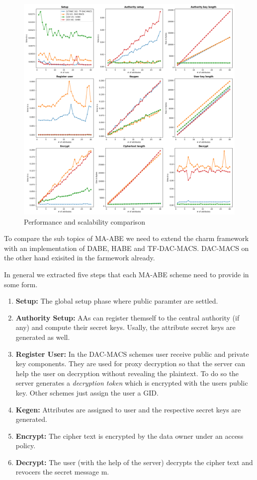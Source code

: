 \begin{figure}[!ht]
\centering
    \includegraphics[width=1\linewidth]{img/maabe_comparisons.png}
    \caption{Performance and scalability comparison}
    \label{fig:maabe_comparison}
\end{figure}

To compare the sub topics of \ac{MA-ABE} we need to extend the charm framework with an implementation of \ac{DABE}, \ac{HABE} and \ac{TF-DAC-MACS}. \ac{DAC-MACS} on the other hand exisited in the farmework already. 

In general we extracted five steps that each \ac{MA-ABE} scheme need to provide in some form. 
\begin{enumerate}
	\item \textbf{Setup:} The global setup phase where public paramter are settled.
	\item \textbf{Authority Setup:} \ac{AA}s can register themself to the central authority (if any) and compute their secret keys. Usally, the attribute secret keys are generated as well. 
	\item \textbf{Register User:} In the \ac{DAC-MACS} schemes user receive public and private key components. They are used for proxy decryption so that the server can help the user on decryption without revealing the plaintext. To do so the server generates a \textit{decryption token} which is encrypted with the users public key. Other schemes just assign the user a \ac{GID}. 
	\item \textbf{Kegen:} Attributes are assigned to user and the respective secret keys are generated.
	\item \textbf{Encrypt:} The cipher text is encrypted by the data owner under an access policy.
	\item \textbf{Decrypt:} The user (with the help of the server) decrypts the cipher text and revocers the secret message m. 
\end{enumerate}

